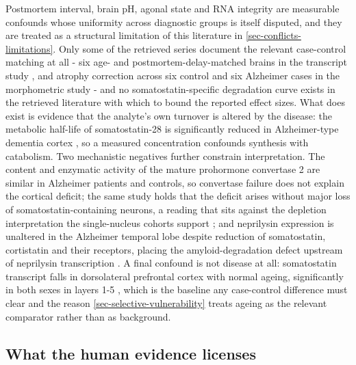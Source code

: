 \documentclass[11pt]{article}
\begin{document}
Postmortem interval, brain pH, agonal state and RNA integrity are measurable confounds whose uniformity across diagnostic groups is itself disputed, and they are treated as a structural limitation of this literature in \ref{sec-conflicts-limitations}. Only some of the retrieved series document the relevant case-control matching at all - six age- and postmortem-delay-matched brains in the transcript study \citep{Dournaud1994}, and atrophy correction across six control and six Alzheimer cases in the morphometric study \citep{Davies1990} - and no somatostatin-specific degradation curve exists in the retrieved literature with which to bound the reported effect sizes. What does exist is evidence that the analyte's own turnover is altered by the disease: the metabolic half-life of somatostatin-28 is significantly reduced in Alzheimer-type dementia cortex \citep{Weber1992}, so a measured concentration confounds synthesis with catabolism. Two mechanistic negatives further constrain interpretation. The content and enzymatic activity of the mature prohormone convertase 2 are similar in Alzheimer patients and controls, so convertase failure does not explain the cortical deficit; the same study holds that the deficit arises without major loss of somatostatin-containing neurons, a reading that sits against the depletion interpretation the single-nucleus cohorts support \citep{WinskySommerer2003}; and neprilysin expression is unaltered in the Alzheimer temporal lobe despite reduction of somatostatin, cortistatin and their receptors, placing the amyloid-degradation defect upstream of neprilysin transcription \citep{Gahete2010}. A final confound is not disease at all: somatostatin transcript falls in dorsolateral prefrontal cortex with normal ageing, significantly in both sexes in layers 1-5 \citep{Sloan2026}, which is the baseline any case-control difference must clear and the reason \ref{sec-selective-vulnerability} treats ageing as the relevant comparator rather than as background.

\subsection{What the human evidence licenses}
\label{sec-09-licensed}
\end{document}
